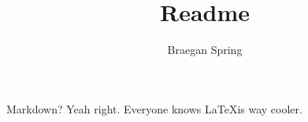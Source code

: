 \documentclass{article}
\title{Readme}
\author{Braegan Spring}
\begin{document}
\maketitle

Markdown? Yeah right. Everyone knows \LaTeX is way cooler. 
\end{document}
